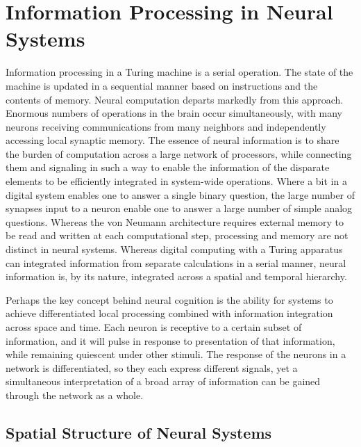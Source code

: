 \documentclass[twocolumn]{article}
\begin{document}
\section{\label{sec:neuroscience}Information Processing in Neural Systems}
Information processing in a Turing machine is a serial operation. The state of the machine is updated in a sequential manner based on instructions and the contents of memory. Neural computation departs markedly from this approach. Enormous numbers of operations in the brain occur simultaneously, with many neurons receiving communications from many neighbors and independently accessing local synaptic memory. The essence of neural information is to share the burden of computation across a large network of processors, while connecting them and signaling in such a way to enable the information of the disparate elements to be efficiently integrated in system-wide operations. Where a bit in a digital system enables one to answer a single binary question, the large number of synapses input to a neuron enable one to answer a large number of simple analog questions. Whereas the von Neumann architecture requires external memory to be read and written at each computational step, processing and memory are not distinct in neural systems. Whereas digital computing with a Turing apparatus can integrated information from separate calculations in a serial manner, neural information is, by its nature, integrated across a spatial and temporal hierarchy.

Perhaps the key concept behind neural cognition is the ability for systems to achieve differentiated local processing combined with information integration across space and time. Each neuron is receptive to a certain subset of information, and it will pulse in response to presentation of that information, while remaining quiescent under other stimuli. The response of the neurons in a network is differentiated, so they each express different signals, yet a simultaneous interpretation of a broad array of information can be gained through the network as a whole. 

\subsection{Spatial Structure of Neural Systems}
\end{document}
